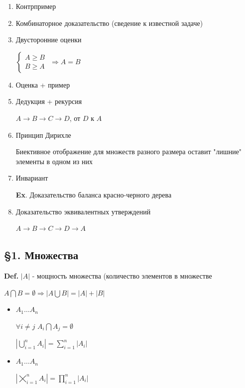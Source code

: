 \documentclass[14pt, letter paper]{article}
\begin{document}
\begin{enumerate}
    $A \rightarrow B \rightarrow C \rightarrow D$, от $A$ к $D$

    \item Контрпример

    \item Комбинаторное доказательство (сведение к известной задаче)

    \item Двусторонние оценки

    $\begin{cases}
        A \geq B \\
        B \geq A
    \end{cases}$
    $\Rightarrow A = B$

    \item Оценка + пример

    \item Дедукция + рекурсия

    $A \rightarrow B \rightarrow C \rightarrow D$, от $D$ к $A$

    \item Принцип Дирихле

    Биективное отображение для множеств разного размера оставит "лишние" элементы в одном из них

    \item Инвариант

    \textbf{Ex}. Доказательство баланса красно-черного дерева

    \item Доказательство эквивалентных утверждений

    $A \rightarrow B \rightarrow C \rightarrow D \rightarrow A$
\end{enumerate}

\begin{center}
    \subsection*{\S 1. Множества}
\end{center}

\textbf{Def.} $|A|$ - мощность множества (количество элементов в множестве

$A \bigcap B = \emptyset \Rightarrow |A \bigcup B| = |A| + |B|$ 

\begin{itemize}
    \item $A_1 \ldots A_n$

    $\forall i \neq j$ $A_i \bigcap A_j = \emptyset$

    $|\bigcup\limits_{i = 1}^{n} A_i| = \sum\limits_{i=1}^{n} |A_i|$

    \item $A_1 \ldots A_n$

    $|\bigtimes\limits_{i=1}^{n} A_i| = \prod\limits_{i=1}^{n} |A_i|$
\end{itemize}
\end{document}
